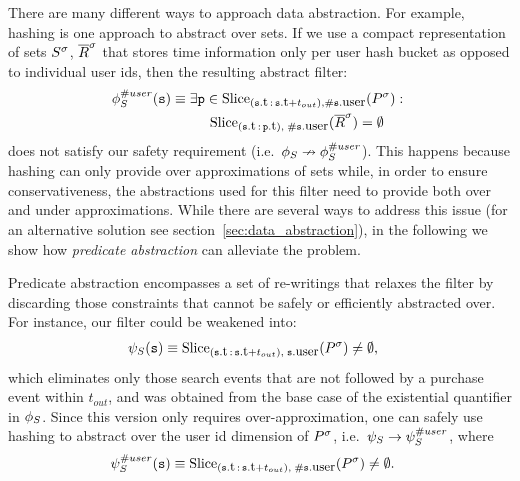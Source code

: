 There are many different ways to approach data abstraction.  For example, hashing
is one approach to abstract over sets.  If we use a compact representation of
sets ${S}^{\sigma}$, ${\overline{R}}^{\sigma}$ that stores time information only per user hash
bucket as opposed to individual user ids, then the resulting abstract filter:
\begin{align*}
&
\PrecedesP^{\hashid{user}}(\symv{s}) \equiv 
\exists \symv{p} \in 
\slice{\syms{P}}
{(\facc{\symv{s}}{t}\,:\,\facc{\symv{s}}{t} + t_{out}),
	\hashid{\facc{\symv{s}}{user}}} :\ 
\\
&\qqquad\qquad\quad
\slice{\syms{\oR}}
{(\facc{\symv{s}}{t}\,:\,\facc{\symv{p}}{t}),\; 
	\hashid{\facc{\symv{s}}{user}}}
= \emptyset 
\end{align*}
does not satisfy our safety requirement 
(i.e.\ $\phi_{S} \nrightarrow \phi_{S}^{\# user}$).
This happens because hashing can only provide over approximations of sets while,
in order to ensure conservativeness, the abstractions used for this filter need
to provide both over and under approximations.
While there are several ways to address this issue (for an alternative solution 
see section~\ref{sec:data_abstraction}), 
in the following we show how {\em predicate abstraction} can alleviate the 
problem.


Predicate abstraction encompasses a set of re-writings 
that relaxes the filter by discarding those constraints that cannot be safely
or efficiently abstracted over.
For instance, our filter could be weakened into:
\begin{align*}
&
\PrecedesPPP(\symv{s}) \equiv 
\slice{\syms{P}}
{(\facc{\symv{s}}{t}\,:\,\facc{\symv{s}}{t} + t_{out}),\; 
	\facc{\symv{s}}{user}}
 \neq \emptyset,
\end{align*} 
which eliminates only those search events that are not followed by a purchase
event within $t_{out}$, and was obtained from the base case of
the existential quantifier in $\phi_{S}$.
Since this version only requires over-approximation, one can safely use hashing
to abstract over the user id dimension of ${P}^{\sigma}$, i.e.\ 
$\psi_S \rightarrow \psi_S^{\# user}$, where
\begin{align*}
&
\PrecedesPPP^{\hashid{user}}(\symv{s}) \equiv 
\slice{\syms{P}}
{(\facc{\symv{s}}{t}\,:\,\facc{\symv{s}}{t} + t_{out}),\; 
	\hashid{\facc{\symv{s}}{user}}}
 \neq \emptyset .
\end{align*}

